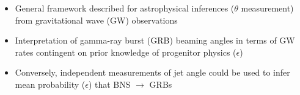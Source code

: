 \documentclass[a0,landscape]{a0poster}
\def\gw#1{gravitational wave#1 (GW#1)\gdef\gw{GW}}
\def\grb#1{gamma-ray burst#1 (GRB#1)\gdef\grb{GRB}}
\begin{document}
\begin{multicols}{4}
\begin{itemize}
    \item General framework described for astrophysical inferences
        ($\theta$ measurement) from \gw{} observations
    \item Interpretation of \grb{} beaming angles in terms of \gw{} rates
        contingent on prior knowledge of progenitor physics ($\epsilon$)
    \item Conversely, independent measurements of jet angle could be
        used to infer mean probability ($\epsilon$) that BNS $\rightarrow$ \grb{s}
\end{itemize}
%
   \color{DarkSlateGray} %



\footnotesize{
}





\end{multicols}
\end{document}

